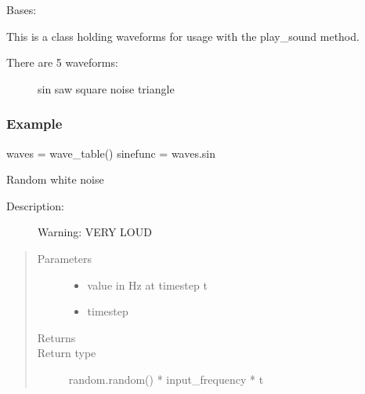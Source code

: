 \documentclass[letterpaper,10pt,english,openany,oneside]{sphinxmanual}
\begin{document}
\begin{fulllineitems}
\sphinxAtStartPar
Bases: 

\sphinxAtStartPar
This is a class holding waveforms for usage with the play\_sound method.
\begin{description}
\item[{There are 5 waveforms:}] \leavevmode
\sphinxAtStartPar
sin
saw
square
noise
triangle

\end{description}
\subsubsection*{Example}

\sphinxAtStartPar
waves = wave\_table()
sinefunc = waves.sin


\begin{fulllineitems}
\sphinxAtStartPar
Random white noise
\begin{description}
\item[{Description:}] \leavevmode
\sphinxAtStartPar
Warning: VERY LOUD

\end{description}
\begin{quote}\begin{description}
\item[{Parameters}] \leavevmode\begin{itemize}
\item {} 
\sphinxAtStartPar
{} \textendash{} value in Hz at timestep t

\item {} 
\sphinxAtStartPar
{} \textendash{} timestep

\end{itemize}

\item[{Returns}] \leavevmode
\sphinxAtStartPar


\item[{Return type}] \leavevmode
\sphinxAtStartPar
random.random() * input\_frequency * t

\end{description}\end{quote}


\end{fulllineitems}
\end{fulllineitems}
\end{document}
